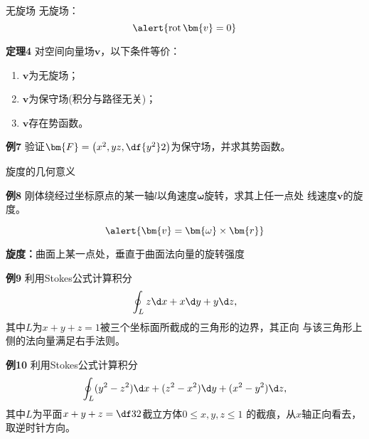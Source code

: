 \begin{frame}{无旋场}
	\linespread{1.2}\pause 
	{\bb 无旋场：}
	$$\alert{\mathrm{rot}\,\bm{v}=0}$$\pause 
	\begin{block}{{\bf 定理4}\hfill}
		对空间向量场$\bm{v}$，以下条件等价：\pause 
		\begin{enumerate}
		  \item $\bm{v}$为无旋场；\pause 
		  \item $\bm{v}$为保守场(积分与路径无关)；\pause 
		  \item $\bm{v}$存在势函数。
		\end{enumerate}
	\end{block}
\end{frame}

\begin{frame}
	\linespread{1.2}
	\begin{exampleblock}{{\bf 例7}\hfill}
		验证$\bm{F}=\left(x^2,yz,\df{y^2}2\right)$为保守场，并求其势函数。
	\end{exampleblock}
\end{frame}

\begin{frame}{旋度的几何意义}
	\linespread{1.2}
	\begin{exampleblock}{{\bf 例8}\hfill}
		刚体绕经过坐标原点的某一轴$l$以角速度$\bm{\omega}$旋转，求其上任一点处
		线速度$\bm{v}$的旋度。
	\end{exampleblock}\pause
	$$\alert{\bm{v}=\bm{\omega}\times\bm{r}}$$
	\pause%
	
	\alert{{\bf 旋度：}曲面上某一点处，垂直于曲面法向量的旋转强度}
\end{frame}

\begin{frame}
	\linespread{1.2}
	\begin{exampleblock}{{\bf 例9}\hfill}
		利用Stokes公式计算积分
		$$\oint_Lz\d x+x\d y+y\d z,$$
		其中$L$为$x+y+z=1$被三个坐标面所截成的三角形的边界，其正向
		与该三角形上侧的法向量满足右手法则。
	\end{exampleblock}
\end{frame}

\begin{frame}
	\linespread{1.2}
	\begin{exampleblock}{{\bf 例10}\hfill}
		利用Stokes公式计算积分
		$$\oint_L(y^2-z^2)\d x+(z^2-x^2)\d y+(x^2-y^2)\d z,$$
		其中$L$为平面$x+y+z=\df 32$截立方体$0\leq x,y,z\leq 1$
		的截痕，从$x$轴正向看去，取逆时针方向。
	\end{exampleblock}
\end{frame}

